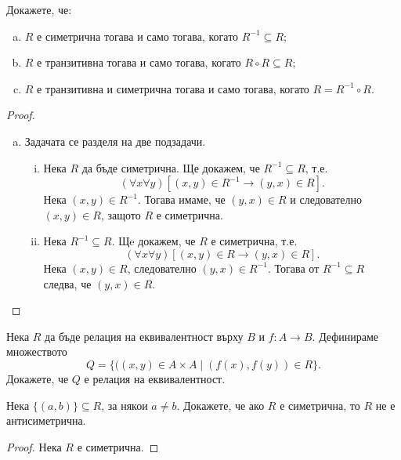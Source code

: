   
\begin{problem}
  Докажете, че:
  \begin{enumerate}[a)]
  \item
    $R$ е симетрична тогава и само тогава, когато $R^{-1}\subseteq R$;
  \item
    $R$ е транзитивна тогава и само тогава, когато $R\circ R\subseteq R$;
  \item
    $R$ е транзитивна и симетрична тогава и само тогава, когато $R = R^{-1}\circ R$.
\end{enumerate}
\end{problem}
\begin{proof}
  \begin{enumerate}[a)]
  \item
    Задачата се разделя на две подзадачи.
    \begin{enumerate}[(i)]
    \item
      Нека $R$ да бъде симетрична. Ще докажем, че $R^{-1}\subseteq R$, т.е.
      \[(\forall x\forall y)[(x,y)\in R^{-1} \rightarrow (y,x)\in R].\]
      Нека $(x,y)\in R^{-1}$. Тогава имаме, че $(y,x)\in R$ и следователно $(x,y)\in R$,
      защото $R$ е симетрична.
    \item
      Нека $R^{-1}\subseteq R$. Щe докажем, че $R$ е симетрична, т.е.
      \[(\forall x\forall y)[(x,y)\in R \rightarrow (y,x)\in R].\]
      Нека $(x,y)\in R$, следователно $(y,x)\in R^{-1}$.
      Тогава от $R^{-1}\subseteq R$ следва, че $(y,x)\in R$.
    \end{enumerate}
  \end{enumerate}
\end{proof}


\begin{problem}
  Нека $R$ да бъде релация на еквивалентност върху $B$ и $f:A\to B$.
  Дефинираме множеството \[Q = \{((x,y)\in A\times A\mid (f(x),f(y))\in R\}.\]
  Докажете, че $Q$ е релация на еквивалентност.
\end{problem}

\begin{problem}
  Нека $\{(a,b)\}\subseteq R$, за някои $a\neq b$.
  Докажете, че ако $R$ е симетрична, то $R$ не е антисиметрична.
\end{problem}
\begin{proof}
  Нека $R$ е симетрична.
\end{proof}



